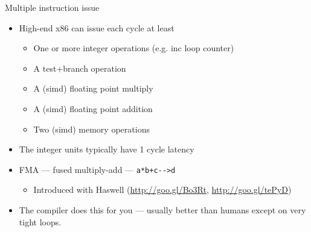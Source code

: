 \begin{frame}[fragile]{Multiple instruction issue}
  \begin{itemize}
  \item High-end x86 can issue each cycle at least
    \begin{itemize}
    \item  One or more integer operations (e.g. inc loop counter)
    \item A test+branch operation
    \item A (simd) floating point multiply
    \item A (simd) floating point addition
    \item Two (simd) memory operations
    \end{itemize}
  \item The integer units typically have 1 cycle latency
  \item FMA --- fused multiply-add --- \verb,a*b+c-->d,
    \begin{itemize}
    \item Introduced with Haswell (\url{http://goo.gl/Bo3Rt}, \url{http://goo.gl/tePyD})
    \end{itemize}
  \item The compiler does this for you --- usually better than humans except on very tight loops.
  \end{itemize}
  
\end{frame}

